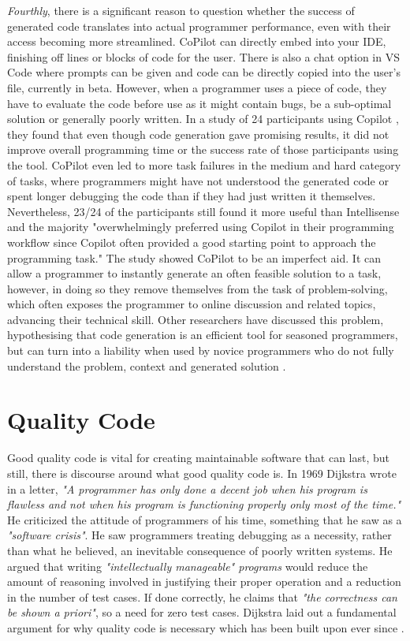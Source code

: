 \documentclass[manuscript,screen,review,sigconf]{acmart}
\begin{document}
\textit{Fourthly}, there is a significant reason to question whether the success of generated code translates into actual programmer performance, even with their access becoming more streamlined. CoPilot can directly embed into your IDE, finishing off lines or blocks of code for the user. There is also a chat option in VS Code where prompts can be given and code can be directly copied into the user's file, currently in beta. However, when a programmer uses a piece of code, they have to evaluate the code before use as it might contain bugs, be a sub-optimal solution or generally poorly written. In a study of 24 participants using Copilot \cite{Expectation_vs_Experience}, they found that even though code generation gave promising results, it did not improve overall programming time or the success rate of those participants using the tool. CoPilot even led to more task failures in the medium and hard category of tasks, where programmers might have not understood the generated code or spent longer debugging the code than if they had just written it themselves. Nevertheless, 23/24 of the participants still found it more useful than Intellisense and the majority "overwhelmingly preferred using Copilot in their programming workflow since Copilot often provided a good starting point to approach the programming task." The study showed CoPilot to be an imperfect aid. It can allow a programmer to instantly generate an often feasible solution to a task, however, in doing so they remove themselves from the task of problem-solving, which often exposes the programmer to online discussion and related topics, advancing their technical skill. Other researchers have discussed this problem, hypothesising that code generation is an efficient tool for seasoned programmers, but can turn into a liability when used by novice programmers who do not fully understand the problem, context and generated solution \cite{CopilotPairProgrammer}.

\section{Quality Code}
Good quality code is vital for creating maintainable software that can last, but still, there is discourse around what good quality code is. In 1969 Dijkstra wrote in a letter, \textit{"A programmer has only done a decent job when his program is flawless and not when his program is functioning properly only most of the time."} He criticized the attitude of programmers of his time, something that he saw as a \textit{"software crisis"}. He saw programmers treating debugging as a necessity, rather than what he believed, an inevitable consequence of poorly written systems. He argued that writing \textit{"intellectually manageable" programs} would reduce the amount of reasoning involved in justifying their proper operation and a reduction in the number of test cases. If done correctly, he claims that \textit{"the correctness can be shown a priori"}, so a need for zero test cases. Dijkstra laid out a fundamental argument for why quality code is necessary which has been built upon ever since \cite{EWD:EWD288}.
\end{document}
